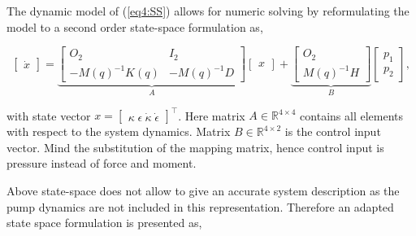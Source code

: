 The dynamic model of (\ref{eq4:SS}) allows for numeric solving by reformulating the model to a second order state-space formulation as,

\begin{equation}
     \begin{bmatrix} \dot{x}  \end{bmatrix}   = \underbrace{  \begin{bmatrix} O_2 & I_2 \\ -M(q)^{-1}K(q)  & -M(q)^{-1} D \end{bmatrix}   }_{A} \begin{bmatrix} x \end{bmatrix}  +      \underbrace{\begin{bmatrix} O_2 \\ M(q)^{-1}H   \end{bmatrix}   }_{B}    \begin{bmatrix} p_1\\ p_2  
     \end{bmatrix}, 
     \label{eq4:SS}
\end{equation}

with state vector $x = \begin{bmatrix} \kappa \hspace{3pt} \epsilon \hspace{3pt} \dot{\kappa}  \hspace{3pt} \dot{\epsilon}  \end{bmatrix}^{\top}$. Here matrix $A \in \mathbb{R}^{4\times 4}$ contains all elements with respect to the system dynamics. Matrix $B\in\mathbb{R}^{4 \times 2}$ is the control input vector. Mind the substitution of the mapping matrix, hence control input is pressure instead of force and moment. 

Above state-space does not allow to give an accurate system description as the pump dynamics are not included in this representation. Therefore an adapted state space formulation is presented as,


